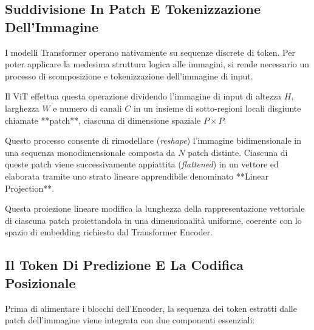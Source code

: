 ﻿\documentclass[11pt, a4paper]{article}
\begin{document}

\subsection{Suddivisione In Patch E Tokenizzazione Dell'Immagine}

I modelli Transformer operano nativamente su sequenze discrete di token. Per poter applicare la medesima struttura logica alle immagini, si rende necessario un processo di scomposizione e tokenizzazione dell'immagine di input.


Il ViT effettua questa operazione dividendo l'immagine di input di altezza $H$, larghezza $W$ e numero di canali $C$ in un insieme di sotto-regioni locali disgiunte chiamate **patch**, ciascuna di dimensione spaziale $P \times P$.


Questo processo consente di rimodellare (\emph{reshape}) l'immagine bidimensionale in una sequenza monodimensionale composta da $N$ patch distinte. Ciascuna di queste patch viene successivamente appiattita (\emph{flattened}) in un vettore ed elaborata tramite uno strato lineare apprendibile denominato **Linear Projection**.


Questa proiezione lineare modifica la lunghezza della rappresentazione vettoriale di ciascuna patch proiettandola in una dimensionalità uniforme, coerente con lo spazio di embedding richiesto dal Transformer Encoder.

\subsection{Il Token Di Predizione E La Codifica Posizionale}

Prima di alimentare i blocchi dell'Encoder, la sequenza dei token estratti dalle patch dell'immagine viene integrata con due componenti essenziali:
\end{document}
